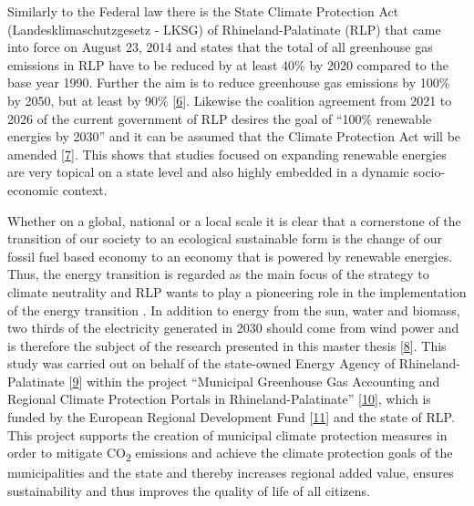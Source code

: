 \documentclass[a4paper,11pt]{article}
\begin{document}
Similarly to the Federal law there is the State Climate Protection Act (Landesklimaschutzgesetz - LKSG) of Rhineland-Palatinate (RLP) that came into force on August 23, 2014 and states that the total of all greenhouse gas emissions in RLP have to be reduced by at least 40\% by 2020 compared to the base year 1990. Further the aim is to reduce greenhouse gas emissions by 100\% by 2050, but at least by 90\% {[}\protect\hyperlink{ref-RheinlandPfalz.19.08.2014}{6}{]}. Likewise the coalition agreement from 2021 to 2026 of the current government of RLP desires the goal of ``100\% renewable energies by 2030'' and it can be assumed that the Climate Protection Act will be amended {[}\protect\hyperlink{ref-SPDGruneFDP.2021}{7}{]}. This shows that studies focused on expanding renewable energies are very topical on a state level and also highly embedded in a dynamic socio-economic context.

Whether on a global, national or a local scale it is clear that a cornerstone of the transition of our society to an ecological sustainable form is the change of our fossil fuel based economy to an economy that is powered by renewable energies. Thus, the energy transition is regarded as the main focus of the strategy to climate neutrality and RLP wants to play a pioneering role in the implementation of the energy transition . In addition to energy from the sun, water and biomass, two thirds of the electricity generated in 2030 should come from wind power and is therefore the subject of the research presented in this master thesis {[}\protect\hyperlink{ref-LandesregierungRheinlandPfalz.2021}{8}{]}. This study was carried out on behalf of the state-owned Energy Agency of Rhineland-Palatinate {[}\protect\hyperlink{ref-EnergieagenturRheinlandPfalz.2021}{9}{]} within the project ``Municipal Greenhouse Gas Accounting and Regional Climate Protection Portals in Rhineland-Palatinate'' {[}\protect\hyperlink{ref-KomBiReK.2021}{10}{]}, which is funded by the European Regional Development Fund {[}\protect\hyperlink{ref-EuropeanRegionalDevelopmentFund.2021}{11}{]} and the state of RLP. This project supports the creation of municipal climate protection measures in order to mitigate CO\textsubscript{2} emissions and achieve the climate protection goals of the municipalities and the state and thereby increases regional added value, ensures sustainability and thus improves the quality of life of all citizens.
\end{document}
